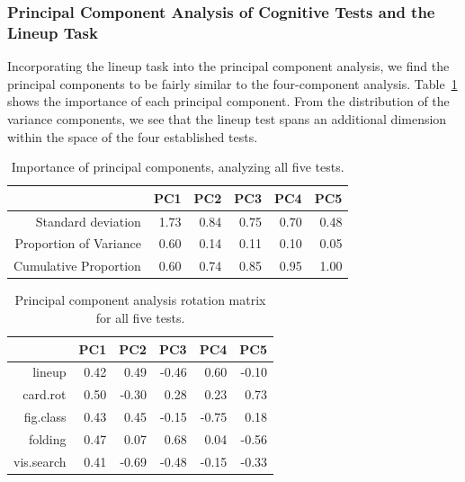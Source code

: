 \documentclass[11pt]{isuthesis}\usepackage[]{graphicx}\usepackage[]{color}
\begin{document}
\subsubsection{Principal Component Analysis of Cognitive Tests and the Lineup Task }
Incorporating the lineup task into the principal component analysis, we find the principal components to be fairly similar to the four-component analysis. 
Table~\ref{tab:PCAvariance5} shows the importance of each principal component. From the distribution of the variance components, we see that the lineup test  spans an additional dimension within the space of the four established tests. 
\begin{table}[ht]
\centering
\caption[Importance of principal components for all five tests]{Importance of principal components, analyzing all five tests.\label{tab:PCAvariance5}} 
{\footnotesize
\begin{tabular}{rrrrrr}
  \hline
 & PC1 & PC2 & PC3 & PC4 & PC5 \\ 
  \hline
Standard deviation & 1.73 & 0.84 & 0.75 & 0.70 & 0.48 \\ 
  Proportion of Variance & 0.60 & 0.14 & 0.11 & 0.10 & 0.05 \\ 
  Cumulative Proportion & 0.60 & 0.74 & 0.85 & 0.95 & 1.00 \\ 
   \hline
\end{tabular}
}
\end{table}


\begin{table}[ht]
\centering
\caption[Principal component analysis rotation matrix for all five tests]{Principal component analysis rotation matrix for all five tests.
             \label{tab:PCArotation5}} 
\begin{tabular}{rrrrrr}
  \hline
 & PC1 & PC2 & PC3 & PC4 & PC5 \\ 
  \hline
lineup & 0.42 & 0.49 & -0.46 & 0.60 & -0.10 \\ 
  card.rot & 0.50 & -0.30 & 0.28 & 0.23 & 0.73 \\ 
  fig.class & 0.43 & 0.45 & -0.15 & -0.75 & 0.18 \\ 
  folding & 0.47 & 0.07 & 0.68 & 0.04 & -0.56 \\ 
  vis.search & 0.41 & -0.69 & -0.48 & -0.15 & -0.33 \\ 
   \hline
\end{tabular}
\end{table}
\end{document}
